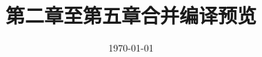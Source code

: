 \documentclass[UTF8,zihao=-4,openany]{ctexbook}
\begin{document}
\frontmatter
\title{第二章至第五章合并编译预览}
\author{ }
\date{\today}
\maketitle
\tableofcontents
\mainmatter
\setcounter{chapter}{1}




\printbibliography
\end{document}
